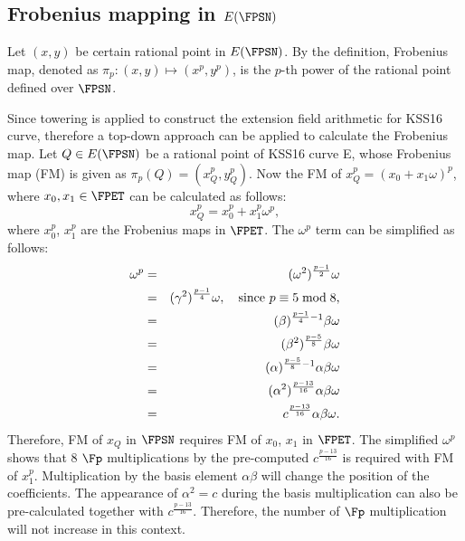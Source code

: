\subsection{Frobenius mapping in $E(\FPSN)$}
Let $(x,y)$ be certain rational point in $E(\FPSN)$. 
By the definition, Frobenius map, denoted as $\pi_p : (x,y) \mapsto  (x^p,y^p)$, is the $p$-th power of the rational point defined over $\FPSN$. 

Since towering is applied to construct the extension field arithmetic for KSS16 curve, therefore a top-down approach can be applied  to calculate the Frobenius map.
Let $Q \in E(\FPSN)$ be a rational point of KSS16 curve E, whose Frobenius map (FM)  is given as $\pi_p(Q) = (x_Q^p, y_Q^p)$. Now the FM of $x_Q^p = (x_0+x_1\omega)^p$, where $x_0,x_1 \in \FPET$ can be calculated as follows:
\begin{equation}
x_Q^p =  x_0^p+x_1^p\omega^p, \nonumber
\end{equation}
where  $x_0^p$, $x_1^p$ are the Frobenius maps in $\FPET$. The $\omega^p$ term can be simplified as follows:
\begin{eqnarray}
\omega^p & = & (\omega^2)^{\frac{p-1}{2}}\omega\nonumber \\
& = & (\gamma^2)^{\frac{p-1}{4}}\omega,  \mbox{\quad since $p \equiv 5 \bmod 8$,} \nonumber \\
& = & (\beta)^{\frac{p-1}{4}-1}\beta\omega \nonumber \\
& = & (\beta^2)^{\frac{p-5}{8}}\beta\omega \nonumber \\
& = & (\alpha)^{\frac{p-5}{8}-1}\alpha\beta \omega\nonumber \\
& = & (\alpha^2)^{\frac{p-13}{16}}\alpha\beta \omega\nonumber \\
& = & c^{\frac{p-13}{16}}\alpha\beta\omega .\nonumber
\end{eqnarray}
Therefore, FM  of $x_Q$ in $\FPSN$ requires FM of  $x_0$, $x_1$ in $\FPET$. The simplified $\omega^p$ shows that 8 $\Fp$ multiplications by  the pre-computed $c^{\frac{p-13}{16}}$ is required with FM of $x_1^p$. Multiplication by the basis element $\alpha\beta$ will change the position of the coefficients. The appearance of $\alpha^2= c$ during the basis multiplication can also be pre-calculated together with $c^{\frac{p-13}{16}}$. Therefore, the number of $\Fp$ multiplication will not increase in this context.

